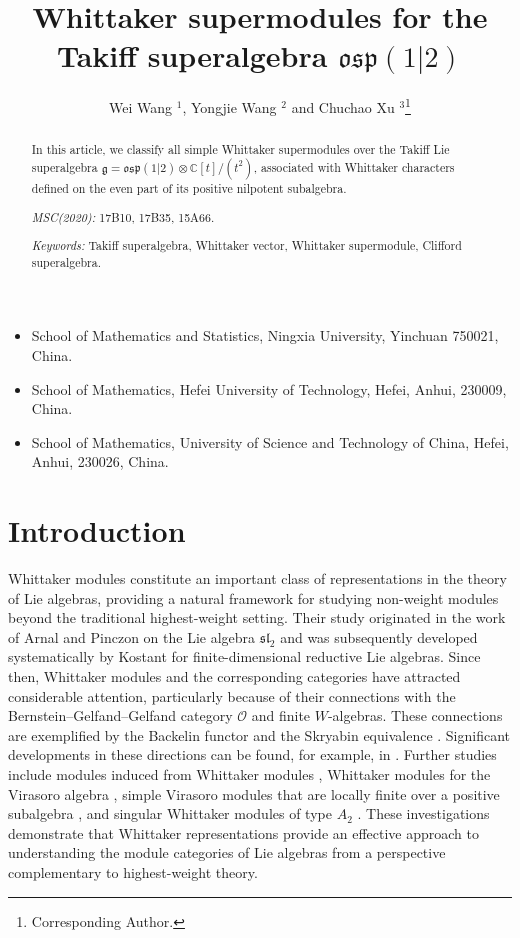 \documentclass[a4paper,10pt]{article}
\theoremstyle{definition}
\theoremstyle{plain}
\theoremstyle{remark}
\theoremstyle{mystyle}
\numberwithin{equation}{section}
\begin{document}
\title{Whittaker supermodules for the Takiff superalgebra $\mathfrak{osp}(1|2)$}
\author{Wei Wang ${}^1$, Yongjie Wang ${}^{2}$ and Chuchao Xu ${}^{3}$\footnote{Corresponding Author.}}
\maketitle


\begin{center}
\footnotesize
\begin{itemize}
\item[1] School of Mathematics and Statistics, Ningxia University, Yinchuan 750021, China.
\item[2] School of Mathematics, Hefei University of Technology, Hefei, Anhui, 230009, China.
\item[3] School of Mathematics, University of Science and Technology of China, Hefei, Anhui, 230026, China.
\end{itemize}
\end{center}

\begin{abstract} 
In this article, we classify all simple Whittaker supermodules over the Takiff Lie superalgebra \(\mathfrak g=\mathfrak{osp}(1|2)\otimes\mathbb C[t]/(t^2)\), associated with Whittaker characters defined on the even part of its positive nilpotent subalgebra.
\bigskip

\noindent\textit{MSC(2020):} 17B10, 17B35, 15A66.
\bigskip

\noindent\textit{Keywords:} Takiff superalgebra, Whittaker vector, Whittaker supermodule, Clifford superalgebra.
\end{abstract}

\section{Introduction}

Whittaker modules constitute an important class of representations in the theory of Lie algebras, providing a natural framework for studying non-weight modules beyond the traditional highest-weight setting. Their study originated in the work of Arnal and Pinczon \cite{AP1974} on the Lie algebra $\mathfrak{sl}_2$ and was subsequently developed systematically by Kostant \cite{K1978} for finite-dimensional reductive Lie algebras. Since then, Whittaker modules and the corresponding categories have attracted considerable attention, particularly because of their connections with the Bernstein–Gelfand–Gelfand category $\mathcal O$ and finite $W$-algebras. These connections are exemplified by the Backelin functor \cite{Ba97} and the Skryabin equivalence \cite{Skr02}. Significant developments in these directions can be found, for example, in \cite{AB2021,Ba97,BM2011,MiSo97}. Further studies include modules induced from Whittaker modules \cite{M1985}, Whittaker modules for the Virasoro algebra \cite{OW2009}, simple Virasoro modules that are locally finite over a positive subalgebra \cite{MZ2013}, and singular Whittaker modules of type \(A_2\) \cite{XG2025}. These investigations demonstrate that Whittaker representations provide an effective approach to understanding the module categories of Lie algebras from a perspective complementary to highest-weight theory.
\end{document}
